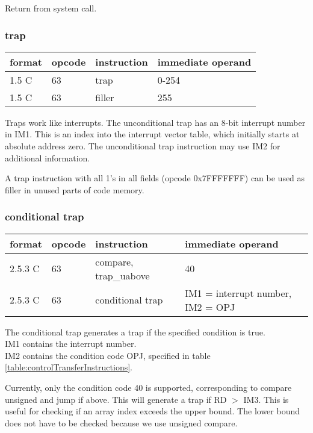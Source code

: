 \documentclass[forwardcom.tex]{subfiles}
\begin{document}
Return from system call.

\subsubsection{trap}
\label{traps}
\label{table:trapInstruction}
\begin{tabular}{|p{12mm}|p{12mm}|p{30mm}|p{80mm}|}
\hline
\bfseries format & \bfseries opcode & \bfseries instruction & \bfseries immediate operand \\ \hline
1.5 C & 63 & trap & 0-254 \\ \hline
1.5 C & 63 & filler & 255 \\ \hline
\end{tabular}
\vspace{2mm}

Traps work like interrupts. The unconditional trap has an 8-bit interrupt number in IM1. This is an index into the interrupt vector table, which initially starts at absolute address zero. The unconditional trap instruction may use IM2 for additional information.  
\vspace{2mm}

A trap instruction with all 1's in all fields (opcode 0x7FFFFFFF) can be used as filler in unused parts of code memory.

\subsubsection{conditional trap}
\label{table:conditionalTrapInstructions}
\begin{tabular}{|p{12mm}|p{12mm}|p{30mm}|p{80mm}|}
\hline
\bfseries format & \bfseries opcode & \bfseries instruction & \bfseries immediate operand \\ \hline
2.5.3 C & 63 & compare, trap\_uabove & 40 \\ \hline
2.5.3 C & 63 & conditional trap & IM1 = interrupt number, IM2 = OPJ \\ \hline
\end{tabular}
\vspace{2mm}

The conditional trap generates a trap if the specified condition is true.\\
IM1 contains the interrupt number. \\
IM2 contains the condition code OPJ, specified in table  \ref{table:controlTransferInstructions}.
\vspace{2mm}

Currently, only the condition code 40 is supported, corresponding to compare unsigned and jump if above. This will generate a trap if RD $>$ IM3. This is useful for checking if an array index exceeds the upper bound. The lower bound does not have to be checked because we use unsigned compare. 
\end{document}
